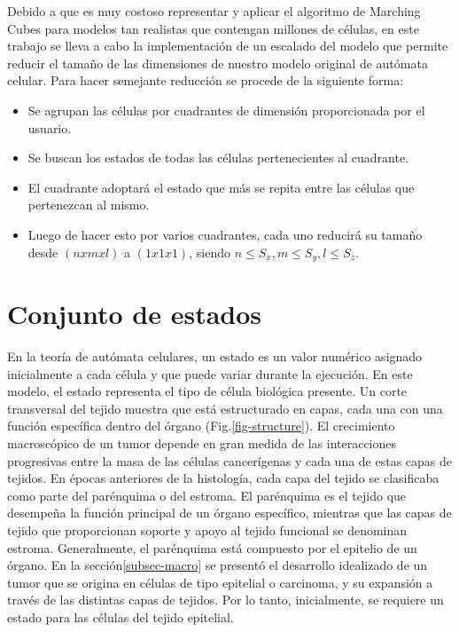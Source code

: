 Debido a que es muy costoso representar y aplicar el algoritmo de Marching Cubes para modelos tan realistas que contengan millones de c\'elulas, en este trabajo se lleva a cabo la implementaci\'on de un escalado del modelo que permite reducir el tama\~no de las dimensiones de nuestro modelo original de aut\'omata celular. Para hacer semejante reducci\'on se procede de la siguiente forma:
\begin{itemize}
    \item Se agrupan las c\'elulas por cuadrantes de dimensi\'on proporcionada por el usuario.
    \item Se buscan los estados de todas las c\'elulas pertenecientes al cuadrante.
    \item El cuadrante adoptar\'a el estado que m\'as se repita entre las c\'elulas que pertenezcan al mismo.
    \item Luego de hacer esto por varios cuadrantes, cada uno reducir\'a su tama\~no desde $(n x m x l)$ a $(1 x 1 x 1)$, siendo $n \leq S_{x} ,m \leq S_{y},l \leq S_{z}$. 
\end{itemize}

\section{Conjunto de estados}
\label{subsec-states}
En la teoría de autómata celulares, un estado es un valor numérico asignado inicialmente a cada célula y que puede variar durante la ejecución. En este modelo, el estado representa el tipo de célula biológica presente. Un corte transversal del tejido muestra que está estructurado en capas, cada una con una función específica dentro del órgano (Fig.\ref{fig-structure}). El crecimiento macroscópico de un tumor depende en gran medida de las interacciones progresivas entre la masa de las células cancerígenas y cada una de estas capas de tejidos. En épocas anteriores de la histología, cada capa del tejido se clasificaba como parte del parénquima o del estroma. El parénquima es el tejido que desempeña la función principal de un órgano específico, mientras que las capas de tejido que proporcionan soporte y apoyo al tejido funcional se denominan estroma. Generalmente, el parénquima está compuesto por el epitelio de un órgano. En la sección\ref{subsec-macro} se presentó el desarrollo idealizado de un tumor que se origina en células de tipo epitelial o carcinoma, y su expansión a través de las distintas capas de tejidos. Por lo tanto, inicialmente, se requiere un estado para las células del tejido epitelial.

